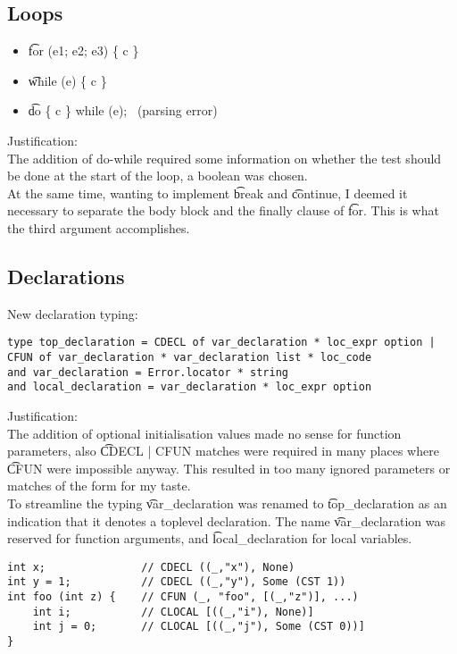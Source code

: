 \subsection{Loops}
\begin{itemize}
    \item \t{for (e1; e2; e3) \{ c \}}
    \not\to\ 
    \to\ 
    \item \t{while (e) \{ c \}}
    \not\to\ 
    \to\ 
    \item \t{do \{ c \} while (e);}
    \not\to\ (parsing error)
    \to\ 
\end{itemize}
Justification:\\
The addition of do-while required some information on whether the test should be done at the start of the loop, a boolean was chosen.\\
At the same time, wanting to implement \t{break} and \t{continue}, I deemed it necessary to separate the body block and the finally clause of \t{for}. This is what the third argument accomplishes.

\subsection{Declarations}
New declaration typing:
\begin{verbatim}
type top_declaration = CDECL of var_declaration * loc_expr option | CFUN of var_declaration * var_declaration list * loc_code
and var_declaration = Error.locator * string
and local_declaration = var_declaration * loc_expr option
\end{verbatim}

Justification:\\
The addition of optional initialisation values made no sense for function parameters, also \t{CDECL | CFUN} matches were required in many places where \t{CFUN} were impossible anyway. This resulted in too many ignored parameters or matches of the form  for my taste.\\
To streamline the typing \t{var\_declaration} was renamed to \t{top\_declaration} as an indication that it denotes a toplevel declaration. The name \t{var\_declaration} was reserved for function arguments, and \t{local\_declaration} for local variables.

\begin{verbatim}
int x;               // CDECL ((_,"x"), None)
int y = 1;           // CDECL ((_,"y"), Some (CST 1))
int foo (int z) {    // CFUN (_, "foo", [(_,"z")], ...)
    int i;           // CLOCAL [((_,"i"), None)]
    int j = 0;       // CLOCAL [((_,"j"), Some (CST 0))]
}
\end{verbatim}
